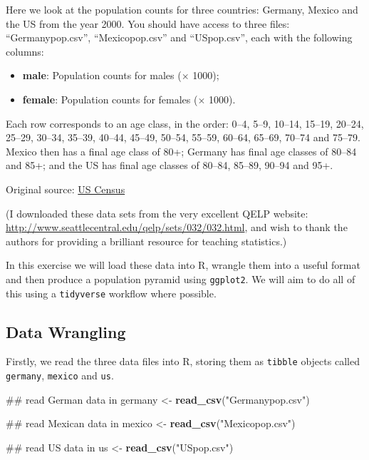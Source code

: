 \documentclass[]{book}
\newenvironment{Shaded}{\begin{snugshade}}{\end{snugshade}}
\newcommand{\KeywordTok}[1]{\textcolor[rgb]{0.13,0.29,0.53}{\textbf{{#1}}}}
\newcommand{\StringTok}[1]{\textcolor[rgb]{0.31,0.60,0.02}{{#1}}}
\newcommand{\NormalTok}[1]{{#1}}
\providecommand{\tightlist}{%
  \setlength{\itemsep}{0pt}\setlength{\parskip}{0pt}}
\theoremstyle{definition}
\theoremstyle{definition}
\theoremstyle{definition}
\theoremstyle{remark}
\begin{document}
Here we look at the population counts for three countries: Germany,
Mexico and the US from the year 2000. You should have access to three
files: ``Germanypop.csv'', ``Mexicopop.csv'' and ``USpop.csv'', each
with the following columns:

\begin{itemize}
\tightlist
\item
  \textbf{male}: Population counts for males (\(\times\) 1000);
\item
  \textbf{female}: Population counts for females (\(\times\) 1000).
\end{itemize}

Each row corresponds to an age class, in the order: 0--4, 5--9, 10--14,
15--19, 20--24, 25--29, 30--34, 35--39, 40--44, 45--49, 50--54, 55--59,
60--64, 65--69, 70--74 and 75--79. Mexico then has a final age class of
80+; Germany has final age classes of 80--84 and 85+; and the US has
final age classes of 80--84, 85--89, 90--94 and 95+.

Original source: \href{http://www.census.gov/}{US Census}

(I downloaded these data sets from the very excellent QELP website:
\url{http://www.seattlecentral.edu/qelp/sets/032/032.html}, and wish to
thank the authors for providing a brilliant resource for teaching
statistics.)

In this exercise we will load these data into R, wrangle them into a
useful format and then produce a population pyramid using
\texttt{ggplot2}. We will aim to do all of this using a
\texttt{tidyverse} workflow where possible.

\subsection{Data Wrangling}\label{data-wrangling-1}

Firstly, we read the three data files into R, storing them as
\texttt{tibble} objects called \texttt{germany}, \texttt{mexico} and
\texttt{us}.

\begin{Shaded}
\begin{Highlighting}[]
\NormalTok{## read German data in}
\NormalTok{germany <-}\StringTok{ }\KeywordTok{read_csv}\NormalTok{(}\StringTok{"Germanypop.csv"}\NormalTok{)}

\NormalTok{## read Mexican data in}
\NormalTok{mexico <-}\StringTok{ }\KeywordTok{read_csv}\NormalTok{(}\StringTok{"Mexicopop.csv"}\NormalTok{)}

\NormalTok{## read US data in}
\NormalTok{us <-}\StringTok{ }\KeywordTok{read_csv}\NormalTok{(}\StringTok{"USpop.csv"}\NormalTok{)}
\end{Highlighting}
\end{Shaded}
\end{document}
